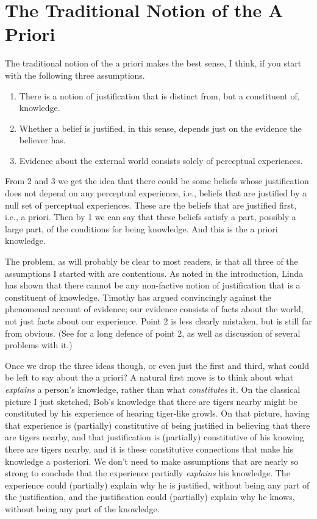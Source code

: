 \section{The Traditional Notion of the A Priori}
\label{thetraditionalnotionoftheapriori}

The traditional notion of the a priori makes the best sense, I think, if you start with the following three assumptions.

\begin{enumerate}
\item There is a notion of justification that is distinct from, but a constituent of, knowledge.

\item Whether a belief is justified, in this sense, depends just on the evidence the believer has.

\item Evidence about the external world consists solely of perceptual experiences.

\end{enumerate}
From 2 and 3 we get the idea that there could be some beliefs whose justification does not depend on any perceptual experience, i.e., beliefs that are justified by a null set of perceptual experiences. These are the beliefs that are justified first, i.e., a priori. Then by 1 we can say that these beliefs satisfy a part, possibly a large part, of the conditions for being knowledge. And this is the a priori knowledge.

The problem, as will probably be clear to most readers, is that all three of the assumptions I started with are contentious. As noted in the introduction, Linda  \citet{Zagzebski1994} has shown that there cannot be any non-factive notion of justification that is a constituent of knowledge. Timothy  \citet[Ch. 8]{Williamson2000-WILKAI} has argued convincingly against the phenomenal account of evidence; our evidence consists of facts about the world, not just facts about our experience. Point 2 is less clearly mistaken, but is still far from obvious. (See  \citet{ConeeFeldman2004} for a long defence of point 2, as well as discussion of several problems with it.)

Once we drop the three ideas though, or even just the first and third, what could be left to say about the a priori? A natural first move is to think about what \emph{explains} a person's knowledge, rather than what \emph{constitutes} it. On the classical picture I just sketched, Bob's knowledge that there are tigers nearby might be constituted by his experience of hearing tiger-like growls. On that picture, having that experience is (partially) constitutive of being justified in believing that there are tigers nearby, and that justification is (partially) constitutive of his knowing there are tigers nearby, and it is these constitutive connections that make his knowledge a posteriori. We don't need to make assumptions that are nearly so strong to conclude that the experience partially \emph{explains} his knowledge. The experience could (partially) explain why he is justified, without being any part of the justification, and the justification could (partially) explain why he knows, without being any part of the knowledge.

